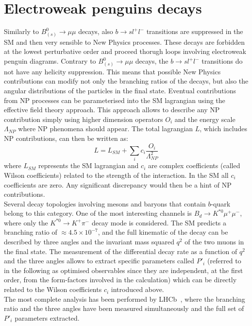 \documentclass{PoS}
\begin{document}
\section{Electroweak penguins decays}
Similarly to $B^0_{(s)} \to \mu \mu$ decays, also $b \to s l^+ l^-$ transitions are suppressed in the SM and then very sensible to New Physics processes. These decays are forbidden at the lowest perturbative order and proceed thorugh loops involving electroweak penguin diagrams. Contrary to $B^0_{(s)} \to \mu \mu$ decays, the $b \to s l^+ l^-$ transitions do not have any helicity suppression. This means that possible New Physics contributions can modify not only the branching ratios of the decays, but also the angular distributions of the particles in the final state. Eventual contributions from NP processes can be parameterised into the SM lagrangian using the effective field theory approach. This approach allows to describe any NP contribution simply using higher dimension operators $O_i$ and the energy scale $\Lambda_{NP}$ where NP phenomena should appear. The total lagrangian $L$, which includes NP contributions, can then be written as:
\begin{equation}
L = L_{SM}+\sum_i c_i \frac{O_i}{\Lambda^2_{NP}}
\label{eq:wilson}
\end{equation}
where $L_{SM}$ represents the SM lagrangian and $c_i$ are complex coefficients (called Wilson coefficients) related to the strength of the interaction. In the SM all $c_i$ coefficients are zero. Any significant discrepancy would then be a hint of NP contributions.\\
Several decay topologies involving mesons and baryons that contain $b$-quark belong to this category. One of the most interesting channels is $B_d \to K^{*0} \mu^+ \mu^-$, where only the $K^{*0} \to K^+ \pi^-$ decay mode is considered. The SM predicts a branching ratio of $\approx 4.5 \times 10^{-7}$, and the full kinematic of the decay can be described by three angles and the invariant mass squared $q^2$ of the two muons in the final state. The measurement of the differential decay rate as a function of $q^2$ and the three angles allows to extract specific parameters called $P'_i$ (referred to in the following as optimised observables since they are independent, at the first order, from the form-factors involved in the calculation) which can be directly related to the Wilson coefficients $c_i$ introduced above. \\
The most complete analysis has been performed by LHCb~\cite{mumuK_LHCb}, where the branching ratio and the three angles have been measured simultaneously and the full set of $P'_i$ parameters extracted.
\end{document}
